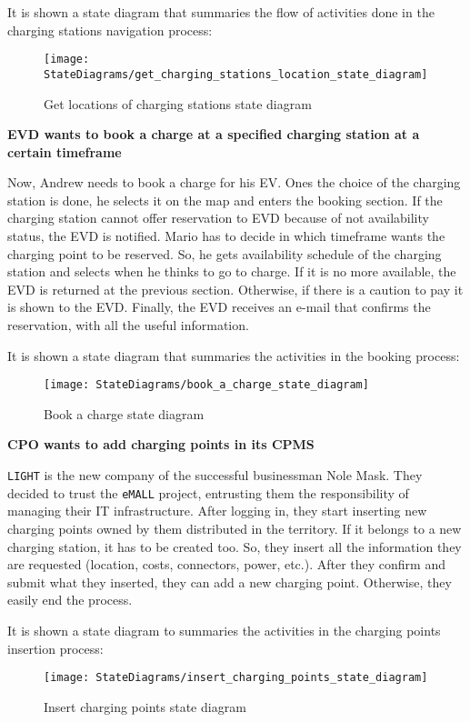 It is shown a state diagram that summaries the flow of activities done in the charging stations navigation process:
\begin{figure}[H]
    \centering
    \texttt{[image: StateDiagrams/get\_charging\_stations\_location\_state\_diagram]}
    \caption{Get locations of charging stations state diagram}
    \label{fig: locations_sd}
\end{figure}

\textbf{EVD wants to book a charge at a specified charging station at a certain timeframe}

Now, Andrew needs to book a charge for his EV. Ones the choice of the charging station is done, he selects it on the map
and enters the booking section.
If the charging station cannot offer reservation to EVD because of not availability status, the EVD is notified.
Mario has to decide in which timeframe wants the charging point to be reserved.
So, he gets availability schedule of the charging station and selects when he thinks to go to charge.
If it is no more available, the EVD is returned at the previous section.
Otherwise, if there is a caution to pay it is shown to the EVD.
Finally, the EVD receives an e-mail that confirms the reservation, with all the useful information.

It is shown a state diagram that summaries the activities in the booking process:
\begin{figure}[H]
    \centering
    \texttt{[image: StateDiagrams/book\_a\_charge\_state\_diagram]}
    \caption{Book a charge state diagram}
    \label{fig: booking_sd}
\end{figure}

\textbf{CPO wants to add charging points in its CPMS}

\verb|LIGHT| is the new company of the successful businessman Nole Mask.
They decided to trust the \verb|eMALL| project, entrusting them the responsibility of managing their IT infrastructure.
After logging in, they start inserting new charging points owned by them distributed in the territory.
If it belongs to a new charging station, it has to be created too.
So, they insert all the information they are requested (location, costs, connectors, power, etc.).
After they confirm and submit what they inserted, they can add a new charging point.
Otherwise, they easily end the process.

It is shown a state diagram to summaries the activities in the charging points insertion process:
\begin{figure}[H]
    \centering
    \texttt{[image: StateDiagrams/insert\_charging\_points\_state\_diagram]}
    \caption{Insert charging points state diagram}
    \label{fig: insert_charging_points_sd}
\end{figure}

